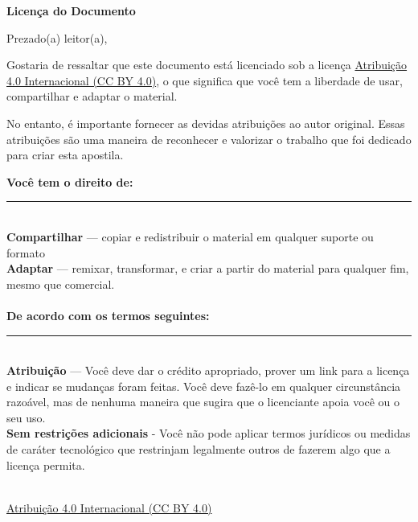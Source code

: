 \begin{center}
\Huge\textbf{Licença do Documento}
\end{center}

Prezado(a) leitor(a),

Gostaria de ressaltar que este documento está licenciado sob a licença \href{https://creativecommons.org/licenses/by/4.0/deed.pt_BR}{Atribuição 4.0 Internacional (CC BY 4.0)}, o que significa que você tem a liberdade de usar, compartilhar e adaptar o material. 

No entanto, é importante fornecer as devidas atribuições ao autor original. Essas atribuições são uma maneira de reconhecer e valorizar o trabalho que foi dedicado para criar esta apostila.

\vfill
\small{\noindent \textbf{Você tem o direito de:}} \vspace{-3mm}\\
\noindent \rule{3.3cm}{0.5pt} \\
\textbf{Compartilhar } — copiar e redistribuir o material em qualquer suporte ou formato \\
\textbf{Adaptar} — remixar, transformar, e criar a partir do material para qualquer fim, mesmo que comercial. \\
\\
\small{\noindent \textbf{De acordo com os termos seguintes:}}\vspace{-3mm}\\
\noindent \rule{3.3cm}{0.5pt} \\
\textbf{Atribuição} — Você deve dar o crédito apropriado, prover um link para a licença e indicar se mudanças foram feitas. Você deve fazê-lo em qualquer circunstância razoável, mas de nenhuma maneira que sugira que o licenciante apoia você ou o seu uso.  \\
\textbf{Sem restrições adicionais} - Você não pode aplicar termos jurídicos ou medidas de caráter tecnológico que restrinjam legalmente outros de fazerem algo que a licença permita.  \\
\vspace{10mm} \\
\centerline{\href{https://creativecommons.org/licenses/by/4.0/deed.pt_BR}{Atribuição 4.0 Internacional (CC BY 4.0)}}
\vspace{5mm}\\
\centerline{\ccby}

